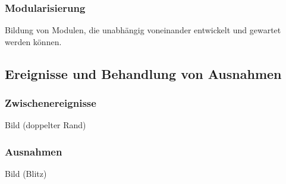     \subsubsection*{Modularisierung}
        Bildung von Modulen, die unabhängig voneinander entwickelt und gewartet werden können.

\subsection{Ereignisse und Behandlung von Ausnahmen}
    \subsubsection*{Zwischenereignisse}
        Bild (doppelter Rand)
    \subsubsection*{Ausnahmen}
        Bild (Blitz)